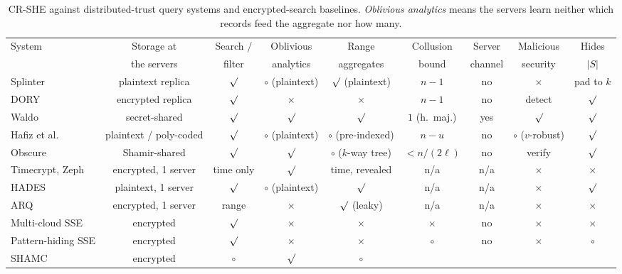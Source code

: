 \documentclass[a4paper,fleqn]{cas-sc}
\providecommand{\checkmark}{\ensuremath{\surd}}
\begin{document}
\begin{table}[pos=t,width=\textwidth]
\caption{CR-SHE against distributed-trust query systems and encrypted-search
baselines. \emph{Oblivious analytics} means the servers learn neither which
records feed the aggregate nor how many.}
\label{tab:compare}
\centering
\scriptsize
\setlength{\tabcolsep}{3pt}
\begin{tabular*}{\tblwidth}{@{\extracolsep{\fill}}lcccccccc@{}}
\toprule
System & Storage at & Search / & Oblivious & Range & Collusion & Server &
Malicious & Hides \\
 & the servers & filter & analytics & aggregates & bound & channel & security &
$|S|$ \\
\midrule
Splinter \citep{splinter} & plaintext replica & $\checkmark$ &
$\circ$ (plaintext) & $\checkmark$ (plaintext) & $n-1$ & no & $\times$ & pad to $k$ \\
DORY \citep{dory} & encrypted replica & $\checkmark$ & $\times$ & $\times$ &
$n-1$ & no & detect & $\checkmark$ \\
Waldo \citep{waldo} & secret-shared & $\checkmark$ & $\checkmark$ &
$\checkmark$ & $1$ (h.\ maj.) & yes & $\checkmark$ & $\checkmark$ \\
Hafiz et al.\ \citep{hafiz2024private} & plaintext / poly-coded & $\checkmark$ &
$\circ$ (plaintext) & $\circ$ (pre-indexed) & $n-u$ & no & $\circ$ ($v$-robust) & $\checkmark$ \\
Obscure \citep{gupta2020obscure} & Shamir-shared & $\checkmark$ & $\checkmark$
& $\circ$ ($k$-way tree) & $< n/(2\ell)$ & no & verify & $\checkmark$ \\
Timecrypt, Zeph \citep{timecrypt,zeph} & encrypted, 1 server & time only &
$\checkmark$ & time, revealed & n/a & n/a & $\times$ & $\times$ \\
HADES \citep{liu2025hades} & plaintext, 1 server & $\checkmark$ & $\circ$ (plaintext) &
$\checkmark$ & n/a & n/a & $\times$ & $\checkmark$ \\
ARQ \citep{espiritu2022arq} & encrypted, 1 server & range & $\times$ &
$\checkmark$ (leaky) & n/a & n/a & $\times$ & $\times$ \\
Multi-cloud SSE \citep{xu2021privacy} & encrypted & $\checkmark$ & $\times$ &
$\times$ & $\times$ & no & $\times$ & $\times$ \\
Pattern-hiding SSE \citep{xu2023symmetric} & encrypted & $\checkmark$ &
$\times$ & $\times$ & $\circ$ & no & $\times$ & $\circ$ \\
SHAMC \citep{wang2020shamc} & encrypted & $\circ$ & $\checkmark$ & $\circ$ &

\end{tabular*}
\end{table}
\end{document}
